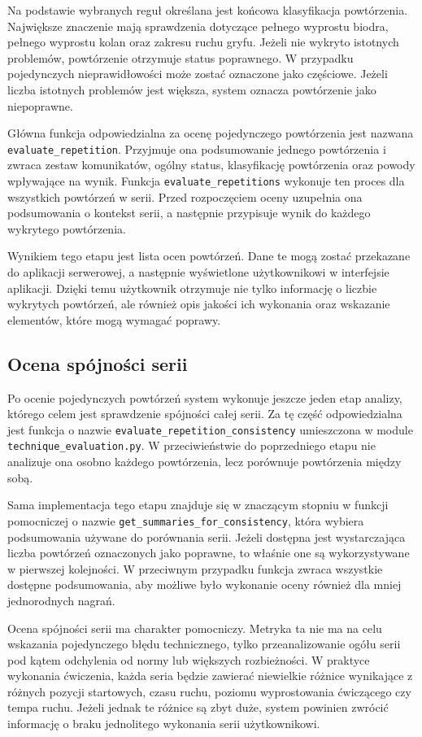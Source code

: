 Na podstawie wybranych reguł określana jest końcowa klasyfikacja powtórzenia. Największe znaczenie mają sprawdzenia dotyczące pełnego wyprostu biodra, pełnego wyprostu kolan oraz zakresu ruchu gryfu. Jeżeli nie wykryto istotnych problemów, powtórzenie otrzymuje status poprawnego. W przypadku pojedynczych nieprawidłowości może zostać oznaczone jako częściowe. Jeżeli liczba istotnych problemów jest większa, system oznacza powtórzenie jako niepoprawne.

Główna funkcja odpowiedzialna za ocenę pojedynczego powtórzenia jest nazwana \texttt{evaluate\_repetition}. Przyjmuje ona podsumowanie jednego powtórzenia i zwraca zestaw komunikatów, ogólny status, klasyfikację powtórzenia oraz powody wpływające na wynik. Funkcja \texttt{evaluate\_repetitions} wykonuje ten proces dla wszystkich powtórzeń w serii. Przed rozpoczęciem oceny uzupełnia ona podsumowania o kontekst serii, a następnie przypisuje wynik do każdego wykrytego powtórzenia.

Wynikiem tego etapu jest lista ocen powtórzeń. Dane te mogą zostać przekazane do aplikacji serwerowej, a następnie wyświetlone użytkownikowi w interfejsie aplikacji. Dzięki temu użytkownik otrzymuje nie tylko informację o liczbie wykrytych powtórzeń, ale również opis jakości ich wykonania oraz wskazanie elementów, które mogą wymagać poprawy.

\subsection{Ocena spójności serii}

Po ocenie pojedynczych powtórzeń system wykonuje jeszcze jeden etap analizy, którego celem jest sprawdzenie spójności całej serii. Za tę część odpowiedzialna jest funkcja o nazwie \texttt{evaluate\_repetition\_consistency} umieszczona w module \texttt{technique\_evaluation.py}. W przeciwieństwie do poprzedniego etapu nie analizuje ona osobno każdego powtórzenia, lecz porównuje powtórzenia między sobą.

Sama implementacja tego etapu znajduje się w znaczącym stopniu w funkcji pomocniczej o nazwie \texttt{get\_summaries\_for\_consistency}, która wybiera podsumowania używane do porównania serii. Jeżeli dostępna jest wystarczająca liczba powtórzeń oznaczonych jako poprawne, to właśnie one są wykorzystywane w pierwszej kolejności. W przeciwnym przypadku funkcja zwraca wszystkie dostępne podsumowania, aby możliwe było wykonanie oceny również dla mniej jednorodnych nagrań.

Ocena spójności serii ma charakter pomocniczy. Metryka ta nie ma na celu wskazania pojedynczego błędu technicznego, tylko przeanalizowanie ogółu serii pod kątem odchylenia od normy lub większych rozbieżności. W praktyce wykonania ćwiczenia, każda seria będzie zawierać niewielkie różnice wynikające z różnych pozycji startowych, czasu ruchu, poziomu wyprostowania ćwiczącego czy tempa ruchu. Jeżeli jednak te różnice są zbyt duże, system powinien zwrócić informację o braku jednolitego wykonania serii użytkownikowi.

